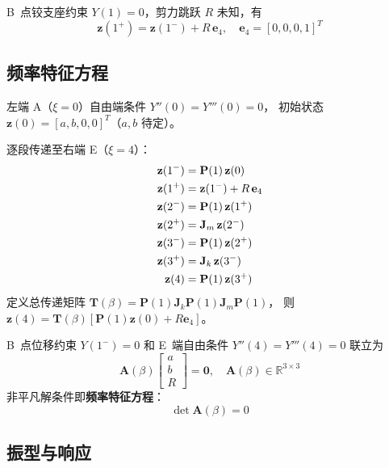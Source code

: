 \documentclass[twoside,12pt]{ctexart}
\begin{document}
B~点铰支座约束 $Y(1)=0$，剪力跳跃 $R$ 未知，有
\begin{equation}\label{eq:Bjump}
  \mathbf{z}(1^+)=\mathbf{z}(1^-)+R\,\mathbf{e}_4,\quad
  \mathbf{e}_4=[0,0,0,1]^T
\end{equation}

\subsection{频率特征方程}

左端 A（$\xi=0$）自由端条件 $Y''(0)=Y'''(0)=0$，
初始状态 $\mathbf{z}(0)=[a,b,0,0]^T$（$a,b$ 待定）。

逐段传递至右端 E（$\xi=4$）：
\begin{align}
  \mathbf{z}(1^-) &= \mathbf{P}(1)\,\mathbf{z}(0) \notag\\
  \mathbf{z}(1^+) &= \mathbf{z}(1^-)+R\,\mathbf{e}_4 \notag\\
  \mathbf{z}(2^-) &= \mathbf{P}(1)\,\mathbf{z}(1^+) \notag\\
  \mathbf{z}(2^+) &= \mathbf{J}_m\,\mathbf{z}(2^-) \notag\\
  \mathbf{z}(3^-) &= \mathbf{P}(1)\,\mathbf{z}(2^+) \notag\\
  \mathbf{z}(3^+) &= \mathbf{J}_k\,\mathbf{z}(3^-) \notag\\
  \mathbf{z}(4)    &= \mathbf{P}(1)\,\mathbf{z}(3^+)
\end{align}
定义总传递矩阵 $\mathbf{T}(\beta)=\mathbf{P}(1)\mathbf{J}_k\mathbf{P}(1)\mathbf{J}_m\mathbf{P}(1)$，
则 $\mathbf{z}(4)=\mathbf{T}(\beta)[\mathbf{P}(1)\mathbf{z}(0)+R\mathbf{e}_4]$。

B~点位移约束 $Y(1^-)=0$ 和 E~端自由条件 $Y''(4)=Y'''(4)=0$ 联立为
\begin{equation}\label{eq:Amatrix}
  \mathbf{A}(\beta)\begin{bmatrix}a\\b\\R\end{bmatrix}=\mathbf{0},\quad
  \mathbf{A}(\beta)\in\mathbb{R}^{3\times 3}
\end{equation}
非平凡解条件即\textbf{频率特征方程}：
\begin{equation}\label{eq:chareq}
  \boxed{\;\det\mathbf{A}(\beta)=0\;}
\end{equation}

\subsection{振型与响应}
\end{document}
